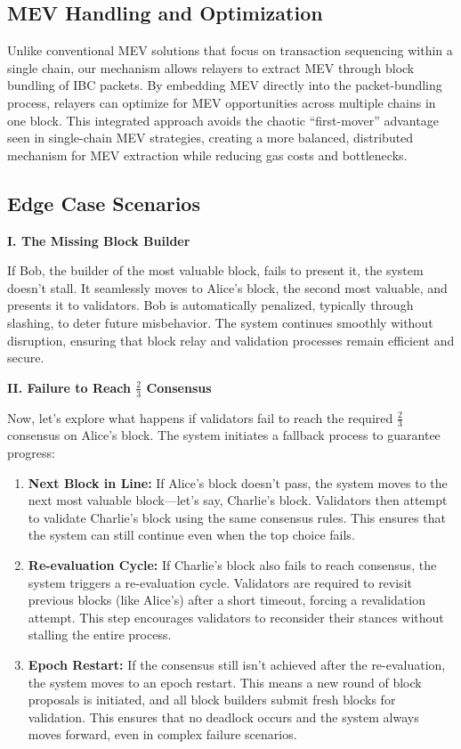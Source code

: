 \documentclass{article}
\begin{document}
\subsection*{MEV Handling and Optimization}

Unlike conventional MEV solutions that focus on transaction sequencing within a single chain, our mechanism allows relayers to extract MEV through block bundling of IBC packets. By embedding MEV directly into the packet-bundling process, relayers can optimize for MEV opportunities across multiple chains in one block. This integrated approach avoids the chaotic “first-mover” advantage seen in single-chain MEV strategies, creating a more balanced, distributed mechanism for MEV extraction while reducing gas costs and bottlenecks.

\subsection*{Edge Case Scenarios}

\textbf{I. The Missing Block Builder}

If Bob, the builder of the most valuable block, fails to present it, the system doesn’t stall. It seamlessly moves to Alice’s block, the second most valuable, and presents it to validators. Bob is automatically penalized, typically through slashing, to deter future misbehavior. The system continues smoothly without disruption, ensuring that block relay and validation processes remain efficient and secure.

\textbf{II. Failure to Reach $\frac{2}{3}$ Consensus}

Now, let’s explore what happens if validators fail to reach the required $\frac{2}{3}$ consensus on Alice’s block. The system initiates a fallback process to guarantee progress:

\begin{enumerate}
    \item \textbf{Next Block in Line:} If Alice’s block doesn’t pass, the system moves to the next most valuable block—let's say, Charlie’s block. Validators then attempt to validate Charlie's block using the same consensus rules. This ensures that the system can still continue even when the top choice fails.
    \item \textbf{Re-evaluation Cycle:} If Charlie’s block also fails to reach consensus, the system triggers a re-evaluation cycle. Validators are required to revisit previous blocks (like Alice’s) after a short timeout, forcing a revalidation attempt. This step encourages validators to reconsider their stances without stalling the entire process.
    \item \textbf{Epoch Restart:} If the consensus still isn’t achieved after the re-evaluation, the system moves to an epoch restart. This means a new round of block proposals is initiated, and all block builders submit fresh blocks for validation. This ensures that no deadlock occurs and the system always moves forward, even in complex failure scenarios.
\end{enumerate}
\end{document}
